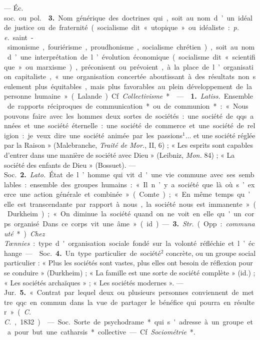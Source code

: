 \begin{itemize}[leftmargin=1cm, label=, itemsep=1pt]
— \si{Éc. soc.} ou \si{pol.}  {\bf 3.} Nom générique des
doctrines qui, soit au nom d’un idéal de justice ou de fraternité (socialisme
dit « utopique » ou idéaliste : {\it p. e.} saint-simonisme, fouriérisme,
proudhonisme, socialisme chrétien), soit au nom d’une interprétation de
l’évolution économique (socialisme dit « scientifique » ou marxisme),
préconisent ou prévoient, à la place de l’organisation capitaliste, « une
organisation concertée aboutissant à des résultats non seulement plus
équitables, mais plus favorables au plein développement de la personne
humaine » (Lalande). Cf. {\it Collectivisme}*.

 —  {\bf 1.} {\it Latiss.} Ensemble de rapports
réciproques de communication* ou de communion* : « Nous pouvons faire avec
les hommes deux sortes de sociétés : une société de qqs. années et une
société éternelle : une société de commerce et une société de religion : je
veux dire une société animée par les passions$^1$... et une société réglée
par la Raison » (Malebranche, {\it Traité de Mor.}, II, 6) ; « Les esprits
sont capables d'entrer dans une manière de société avec Dieu » (Leibniz,
{\it Mon.} 84) ; « La société des enfants de Dieu » (Bossuet). — \si{Soc.}
{\bf 2.} {\it Lato.} État de l’homme qui vit d'une vie commune avec ses
semblables: ensemble des groupes humains : « Il n’y a société que là où
s’exerce une action générale et combinée » (Comte) ; « En même temps qu’elle
est transcendante par rapport à nous, la
société nous est immanente » (Durkheim) ; « On diminue la société quand on ne
voit en elle qu'un corps organisé... Dans ce corps vit une âme » (id.). —
{\bf 3.} {\it Str.} (Opp. : {\it communauté}*). {\it Chez Tœnnies} : type
d'organisation sociale fondé sur la volonté réfléchie et l’échange.

—  \si{Soc.} {\bf 4.} Un type particulier de société$^2$
concrète, ou un groupe social particulier : « Plus les sociétés sont vastes,
plus elles ont besoin de réflexion pour se conduire » (Durkheim) ; « La
famille est une sorte de société complète » (id.) ; « Les sociétés archaïques
» ; « Les sociétés modernes ». — \si{Jur.} {\bf 5.} « Contrat par lequel deux
ou plusieurs personnes conviennent de mettre qqc. en commun dans la vue de
partager le bénéfice qui pourra en résulter » ({\it C. C.}, 1832).

 — \si{Soc.} Sorte de psychodrame* qui s'adresse à un groupe
et a pour but une catharsis* collective. — Cf. {\it Sociométrie}*.


\end{itemize}
